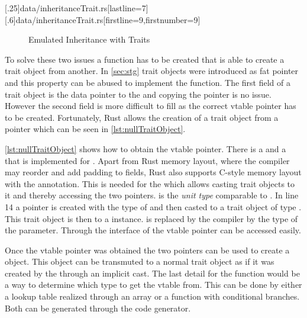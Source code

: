 \documentclass[thesis]{subfiles}
\begin{document}
    \LstTikzBox{\inheritanceTraitOne}[.25\linewidth]{data/inheritanceTrait.rs}[lastline=7]
    \LstTikzBox{\inheritanceTraitTwo}[.6\linewidth]{data/inheritanceTrait.rs}[firstline=9,firstnumber=9]
    \begin{figure}[ht]
      \captionsetup{type=lstlisting}
      \usebox{\inheritanceTraitOne}\hfill%
      \usebox{\inheritanceTraitTwo}
      \caption{Emulated Inheritance with Traits}\label{lst:inheritanceTrait}
    \end{figure}

    To solve these two issues a \cast function has to be created that is able to create a trait object from another.
    In \autoref{sec:stg} trait objects were introduced as fat pointer and this property can be abused to implement the \cast function.
    The first field of a trait object is the data pointer to the \struct and copying the pointer is no issue.
    However the second field is more difficult to fill as the correct vtable pointer has to be created.
    Fortunately, Rust allows the creation of a trait object from a  pointer which can be seen in \autoref{lst:nullTraitObject}\autocite[2.2. Exotically Sized Types]{rust-nom}.
    \autocite{rust-digg}


    \autoref{lst:nullTraitObject} shows how to obtain the vtable pointer.
    There is a  and a  that is implemented for .
    Apart from Rust memory layout, where the compiler may reorder and add padding to fields, Rust also supports C-style memory layout with the \codr{#[repr(C)]} annotation.
    This is needed for the \TraitObject \struct which allows casting trait objects to it and thereby accessing the two pointers.
    \codr{()} is the \emph{unit type} comparable to \autocites[repr(C)]{rust-nom}[Defining and Instantiating Structs]{rust-book}.
    In line 14 a  pointer is created with the type of  and then casted to a trait object of type .
    This trait object is then  to a \TraitObject instance.
    \codr{_} is replaced by the compiler by the type of the parameter.
    Through the interface of \TraitObject the vtable pointer can be accessed easily.

    Once the vtable pointer was obtained the two pointers can be used to create a \TraitObject object.
    This object can be transmuted to a normal trait object as if it was created by the \struct through an implicit cast.
    The last detail for the \cast function would be a way to determine which type to get the vtable from.
    This can be done by either a lookup table realized through an array or a function with conditional branches.
    Both can be generated through the code generator.
\end{document}
